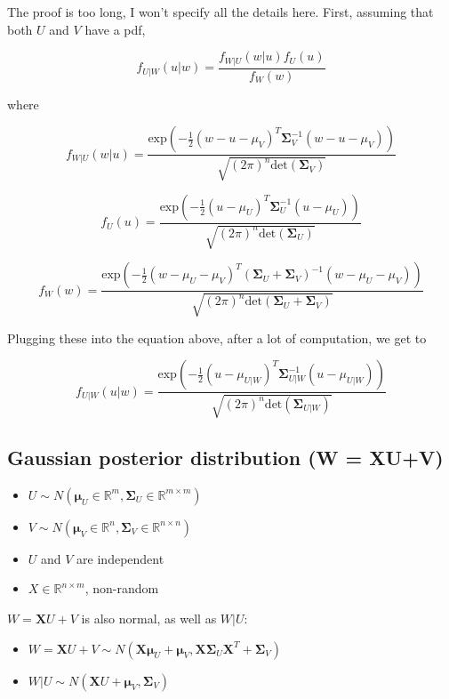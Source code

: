 \documentclass{article}
\begin{document}
\begin{appendices}
The proof is too long, I won't specify all the details here. First, assuming that both $U$ and $V$ have a pdf,

\[
f_{U|W}(u|w) = \frac{f_{W|U}(w|u) f_{U}(u)}{f_{W}(w)}
\]

where

\[
f_{W|U}(w|u) = \frac{\text{exp}\left(-\frac12 (w-u-\mu_V)^T \bm{\Sigma}_V^{-1} (w-u-\mu_V) \right)}{\sqrt{(2\pi)^n \text{det}(\bm{\Sigma}_V)}}
\]

\[
f_{U}(u) = \frac{\text{exp}\left( -\frac12 (u-\mu_U)^T \bm{\Sigma}^{-1}_U (u-\mu_U) \right)}{\sqrt{(2\pi)^n \text{det}(\bm{\Sigma}_U)}}
\]

\[
f_{W}(w) = \frac{\text{exp}\left( -\frac12 (w-\mu_U-\mu_V)^T (\bm{\Sigma}_U + \bm{\Sigma}_V)^{-1} (w-\mu_U-\mu_V) \right)}{\sqrt{(2\pi)^n \text{det}(\bm{\Sigma}_U + \bm{\Sigma}_V)}}
\]

Plugging these into the equation above, after a lot of computation, we get to

\[
f_{U|W}(u|w) = \frac{\text{exp}\left( -\frac12 (u-\mu_{U|W})^T \bm{\Sigma}_{U|W}^{-1} (u-\mu_{U|W}) \right)}{\sqrt{(2\pi)^n \text{det}(\bm{\Sigma}_{U|W})}}
\]



\subsection{Gaussian posterior distribution (W = XU+V)} \label{app:Gaussian_posterior2}

\begin{itemize}
    \item $U \sim N(\bm{\mu}_U \in \mathbb{R}^m, \bm{\Sigma}_U \in \mathbb{R}^{m\times m})$
    \item $V \sim N(\bm{\mu}_V \in \mathbb{R}^n, \bm{\Sigma}_V \in \mathbb{R}^{n\times n})$
    \item $U$ and $V$ are independent
    \item $X \in \mathbb{R}^{n\times m}$, non-random
\end{itemize}

$W = \bm{X}U + V$ is also normal, as well as $W|U$:

\begin{itemize}
    \item $W = \bm{X}U + V \sim N(\bm{X}\bm{\mu}_U + \bm{\mu}_V, \bm{X}\bm{\Sigma}_U\bm{X}^T + \bm{\Sigma}_V)$
    \item $W|U \sim N(\bm{X}U + \bm{\mu}_V, \bm{\Sigma}_V)$
\end{itemize}


\end{appendices}
\end{document}
